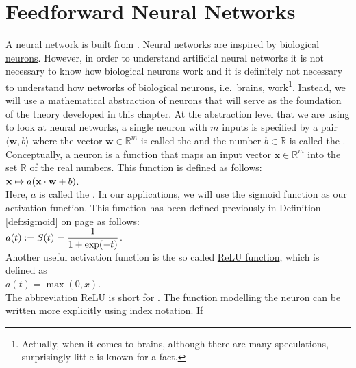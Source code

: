 \section{Feedforward Neural Networks}
A neural network is built from .  Neural networks are inspired by biological 
\href{https://en.wikipedia.org/wiki/Neuron}{neurons}.  However, in order to understand artificial neural
networks it is not necessary to know how biological neurons work and it is definitely not necessary to
understand how networks of biological neurons, i.e.~brains, work\footnote{
  Actually, when it comes to brains, although there are many speculations, surprisingly little is known for a fact.  
}.  
Instead, we will use a mathematical abstraction of neurons that will serve as the foundation of the theory
developed in this chapter.  At the abstraction level that we are using to look at neural networks, a single neuron
with $m$ inputs is specified by a pair $\langle \mathbf{w}, b\rangle$ where the vector $\mathbf{w} \in \mathbb{R}^m$ is called the  and 
the number $b \in \mathbb{R}$ is called the .   
Conceptually, a neuron is a function that maps an input vector $\mathbf{x} \in \mathbb{R}^m$ into the set
$\mathbb{R}$ of the real numbers.  This function is defined as follows: 
\\[0.2cm]
\hspace*{1.3cm}
$\displaystyle \mathbf{x} \mapsto a(\mathbf{x} \cdot \mathbf{w} + b)$.
\\[0.2cm]
Here, $a$ is called the .   In our applications, we will
use the sigmoid function as our activation function.  This function has been defined previously in Definition
\ref{def:sigmoid} on page \pageref{def:sigmoid} as follows:
\\[0.2cm]
\hspace*{1.3cm}
$\displaystyle a(t) := S(t) = \frac{1}{1 + \exp(-t)}$.
\\[0.2cm]
Another useful activation function is the so called
\href{https://en.wikipedia.org/wiki/Rectifier_(neural_networks)}{ReLU function}, 
which is defined as 
\\[0.2cm]
\hspace*{1.3cm}
$a(t) = \max(0, x)$.
\\[0.2cm]
The abbreviation ReLU is short for . 
The function modelling the neuron can be written more explicitly using index notation.  If
\\[0.2cm]
